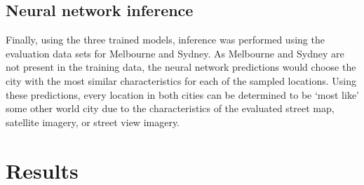 \documentclass[sageh,times]{sagej}
\begin{document}
%
%
%
%
%



\subsection{Neural network inference}\label{sec:methods5}    
Finally, using the three trained models, inference was performed using the evaluation data sets for Melbourne and Sydney. As Melbourne and Sydney are not present in the training data, the neural network predictions would choose the city with the most similar characteristics for each of the sampled locations. Using these predictions, every location in both cities can be determined to be `most like' some other world city due to the characteristics of the evaluated street map, satellite imagery, or street view imagery.

\section{Results}\label{sec:results}
\end{document}
